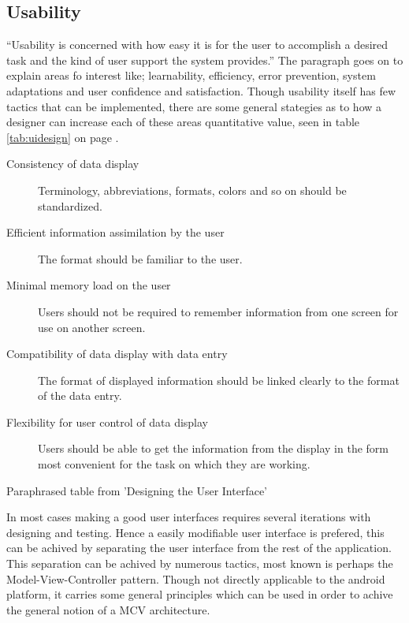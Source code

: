 	\subsection{Usability}
		``Usability is concerned with how easy it is for the user to accomplish a desired task and the kind of user support the system provides.''\cite[p. 90]{bib:archi} The paragraph goes on to explain areas fo interest like; learnability, efficiency, error prevention, system adaptations and user confidence and satisfaction. Though usability itself has few tactics that can be implemented, there are some general stategies as to how a designer can increase each of these areas quantitative value, seen in table \ref{tab:uidesign} on page \pageref{tab:uidesign}. 
		
		\begin{table}[H]
		\begin{description}
			\item[Consistency of data display] Terminology, abbreviations, formats, colors and so on should be standardized.
			\item[Efficient information assimilation by the user] The format should be familiar to the user. 
			\item[Minimal memory load on the user] Users should not be required to remember information from one screen for use on another screen.
			\item[Compatibility of data display with data entry] The format of displayed information should be linked clearly to the format of the data entry.
			\item[Flexibility for user control of data display] Users should be able to get the information from the display in the form most convenient for the task on which they are working.
		\end{description}
		\caption{Paraphrased table from 'Designing the User Interface'\cite[p. 77]{bib:uidesign}}
		\label{tab:uidesign}
		\end{table}
		In most cases making a good user interfaces requires several iterations with designing and testing. Hence a easily modifiable user interface is prefered, this can be achived by separating the user interface from the rest of the application. This separation can be achived by numerous tactics, most known is perhaps the Model-View-Controller pattern. Though not directly applicable to the android platform, it carries some general principles which can be used in order to achive the general notion of a MCV architecture. 
		
